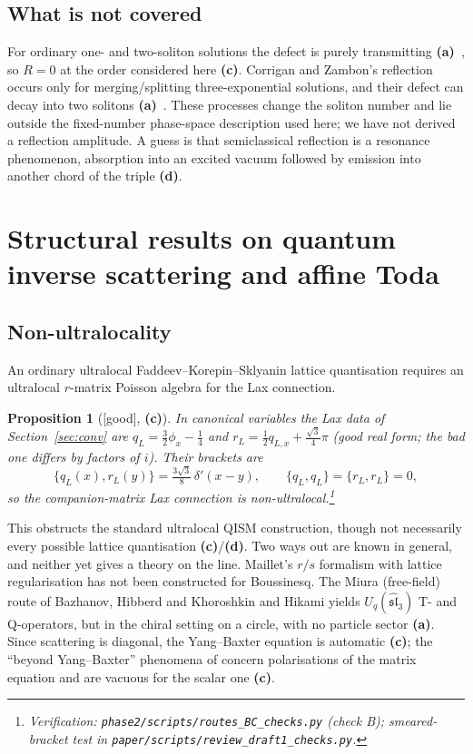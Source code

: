 \documentclass[11pt,a4paper]{article}
\newcommand{\lab}[1]{{\normalfont\sffamily\footnotesize\bfseries(#1)}}
\newcommand{\La}{\lab{a}}
\newcommand{\Lc}{\lab{c}}
\newcommand{\Ld}{\lab{d}}
\newcommand{\eqtag}[2]{{\normalfont\sffamily\footnotesize\textcolor{#1}{[#2]}}}
\newcommand{\Good}{\eqtag{teal!70!black}{good}}
\newcommand{\scr}[1]{\nolinkurl{#1}}
\newcommand{\chk}[1]{\footnote{\raggedright Verification: #1.}}
\newtheorem{proposition}{Proposition}[section]
\theoremstyle{remark}
\begin{document}
\subsection{What is not covered}

For ordinary one- and two-soliton solutions the defect is purely transmitting \La~\cite{CZ}, so $R=0$ at the order considered here \Lc. Corrigan and Zambon's reflection occurs only for merging/splitting three-exponential solutions, and their defect can decay into two solitons \La~\cite{CZ}. These processes change the soliton number and lie outside the fixed-number phase-space description used here; we have not derived a reflection amplitude. A guess is that semiclassical reflection is a resonance phenomenon, absorption into an excited vacuum followed by emission into another chord of the triple \Ld.

\section{Structural results on quantum inverse scattering and affine Toda}\label{sec:structural}

\subsection{Non-ultralocality}

An ordinary ultralocal Faddeev--Korepin--Sklyanin lattice quantisation requires an ultralocal $r$-matrix Poisson algebra for the Lax connection.

\begin{proposition}[\Good, \Lc]\label{prop:nonultra}
In canonical variables the Lax data of Section~\ref{sec:conv} are $q_L=\tfrac32\phi_x-\tfrac14$ and $r_L=\tfrac12q_{L,x}+\tfrac{\sqrt3}4\pi$ (good real form; the bad one differs by factors of $i$). Their brackets are
\[
\{q_L(x),r_L(y)\}=\tfrac{3\sqrt3}8\,\delta'(x-y),\qquad \{q_L,q_L\}=\{r_L,r_L\}=0 ,
\]
so the companion-matrix Lax connection is non-ultralocal.\chk{\scr{phase2/scripts/routes_BC_checks.py} (check B); smeared-bracket test in \scr{paper/scripts/review_draft1_checks.py}}
\end{proposition}

This obstructs the standard ultralocal QISM construction, though not necessarily every possible lattice quantisation \Lc/\Ld. Two ways out are known in general, and neither yet gives a theory on the line. Maillet's $r/s$ formalism with lattice regularisation \cite{Maillet} has not been constructed for Boussinesq. The Miura (free-field) route of Bazhanov, Hibberd and Khoroshkin \cite{BHK} and Hikami \cite{Hikami} yields $U_q(\widehat{\mathfrak{sl}}_3)$ T- and Q-operators, but in the chiral setting on a circle, with no particle sector \La. Since scattering is diagonal, the Yang--Baxter equation is automatic \Lc; the ``beyond Yang--Baxter'' phenomena of \cite{DMHC} concern polarisations of the matrix equation and are vacuous for the scalar one \Lc.
\end{document}

